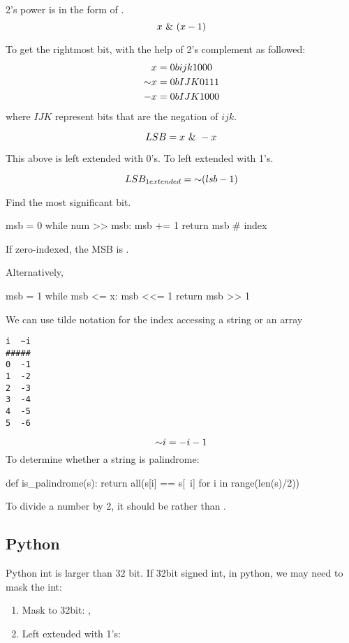 2's power is in the form of .
$$x\ \&\ (x-1)$$

 To get the rightmost bit, with the help of 2's complement as followed:
\begin{align*}
x &= 0bijk1000 \\
\mathord{\sim} x &= 0bIJK0111 \\
-x &= 0bIJK1000
\end{align*}
where $IJK$ represent bits that are the negation of $ijk$.

$$LSB = x \ \&\  -x$$

This above is left extended with 0's. To left extended with 1's. 

$$
LSB_{1extended} = \mathord{\sim} (lsb - 1)
$$

 Find the most significant bit. 
\begin{python}
msb = 0
while num >> msb:
  msb += 1
return msb  # index
\end{python}
If zero-indexed, the MSB is . 

Alternatively,
\begin{python}
msb = 1
while msb <= x:
  msb <<= 1
return msb >> 1
\end{python}

 We can use tilde notation for the index accessing a string or an array
\begin{lstlisting}
i  ~i
#####
0  -1
1  -2
2  -3
3  -4 
4  -5 
5  -6
\end{lstlisting}
$$
\mathord{\sim} i = -i-1
$$
To determine whether a string is palindrome:
\begin{python}
def is_palindrome(s):
  return all(s[i] == s[~i] for i in range(len(s)/2)) 
\end{python}

 To divide a number by 2, it should be  rather than . 

\subsection{Python}
Python int is larger than 32 bit. 
If 32bit signed int, in python, we may need to mask the int:
\begin{enumerate}
\item Mask to 32bit: , 
\item Left extended with 1's: 
\end{enumerate}

